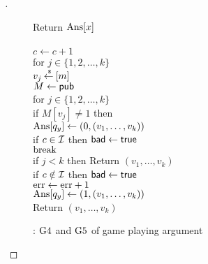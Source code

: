 \begin{proof}[]
\begin{figure}
{{Return $\mathrm{Ans}[x]$\\
%
}
{
\\
$c \gets c + 1$\\
for $j \in \{1,2,\ldots,k\}$\\
\nudge $v_j {\:\stackrel{{\scriptscriptstyle \hspace{0.2em}\$}} {\leftarrow}\:} [m]$\\
%
$M \gets{\sf pub}$\\
for $j \in \{1,2,\ldots,k\}$\\
\nudge if $M[v_j] \neq 1$ then \\
\nudge \nudge $\mathrm{Ans}[q_y] \gets (0, (v_1, \ldots, v_{k}) )$\\
\nudge \nudge if $c \in {\cal I}$ then $\mathsf{bad} \gets \mathsf{true}$\\
\nudge \nudge $\mathrm{break}$\\
if $j < k$ then Return $\left(v_1,\ldots,v_k\right)$\\
if $c \notin {\cal I}$ then $\mathsf{bad} \gets \mathsf{true}$\\
$\mathrm{err} \gets \mathrm{err} +1$\\
$\mathrm{Ans}[q_y] \gets (1, (v_1, \ldots, v_{k}))$\\
Return $\left(v_1,\ldots,v_k\right)$
}
}
\caption{: $\text{G4}$ and $\text{G5}$ of game playing argument}\label{fig:3TGame}
\end{figure}

\end{proof}
